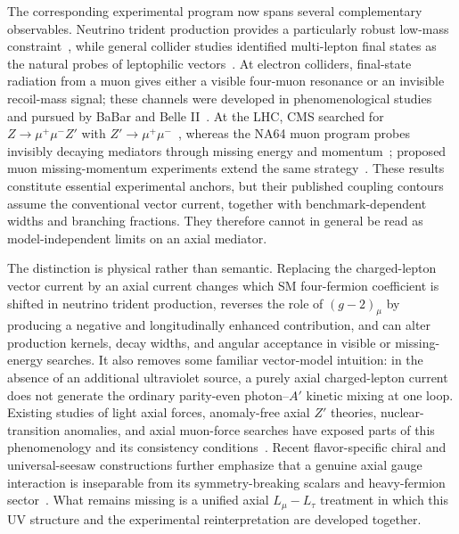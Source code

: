 \documentclass[onecolumn, aps, nofootinbib, prd, preprint, floats, floatfix, amsmath, amssymb, superscriptaddress, preprintnumbers]{revtex4-2}
\begin{document}
The corresponding experimental program now spans several complementary observables. Neutrino trident production provides a particularly robust low-mass constraint~\cite{Altmannshofer:2014pba}, while general collider studies identified multi-lepton final states as the natural probes of leptophilic vectors~\cite{delAguila:2014soa}. At electron colliders, final-state radiation from a muon gives either a visible four-muon resonance or an invisible recoil-mass signal; these channels were developed in phenomenological studies~\cite{Araki:2017wyg,Brown:2024jah} and pursued by BaBar and Belle II~\cite{BaBar:2016sci,Belle-II:2019qfb,Belle-II:2022yaw,Belle-II:2024wtd}. At the LHC, CMS searched for $Z\to\mu^+\mu^-Z'$ with $Z'\to\mu^+\mu^-$~\cite{CMS:2018yxg}, whereas the NA64 muon program probes invisibly decaying mediators through missing energy and momentum~\cite{NA64:2024klw}; proposed muon missing-momentum experiments extend the same strategy~\cite{Kahn:2018cqs}. These results constitute essential experimental anchors, but their published coupling contours assume the conventional vector current, together with benchmark-dependent widths and branching fractions. They therefore cannot in general be read as model-independent limits on an axial mediator.

The distinction is physical rather than semantic. Replacing the charged-lepton vector current by an axial current changes which SM four-fermion coefficient is shifted in neutrino trident production, reverses the role of $(g-2)_\mu$ by producing a negative and longitudinally enhanced contribution, and can alter production kernels, decay widths, and angular acceptance in visible or missing-energy searches. It also removes some familiar vector-model intuition: in the absence of an additional ultraviolet source, a purely axial charged-lepton current does not generate the ordinary parity-even photon--$A'$ kinetic mixing at one loop. Existing studies of light axial forces, anomaly-free axial $Z'$ theories, nuclear-transition anomalies, and axial muon-force searches have exposed parts of this phenomenology and its consistency conditions~\cite{Kahn:2016vjr,Ismail:2016tod,Kozaczuk:2016nma,Hicyilmaz:2022owb,Batell:2011qq,Davoudiasl:2012ag,Fayet:2020bmb,Baruch:2022esd,Fayet:2024ddk}. Recent flavor-specific chiral and universal-seesaw constructions further emphasize that a genuine axial gauge interaction is inseparable from its symmetry-breaking scalars and heavy-fermion sector~\cite{Prajapati:2026tfv,Dutta:2026dnf}. What remains missing is a unified axial $L_\mu-L_\tau$ treatment in which this UV structure and the experimental reinterpretation are developed together.
\end{document}
